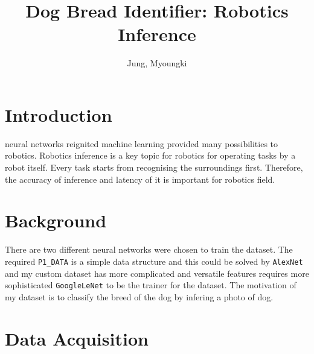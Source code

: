 \documentclass[10pt,journal,compsoc]{IEEEtran}
\begin{document}
\title{Dog Bread Identifier: Robotics Inference}

\author{Jung, Myoungki}

%
{}

\maketitle
\IEEEdisplaynontitleabstractindextext
\IEEEpeerreviewmaketitle
\section{Introduction}
\label{sec:introduction}

 neural networks reignited machine learning provided many possibilities to robotics. Robotics inference is a key topic for robotics for operating tasks by a robot itself. Every task starts from recognising the surroundings first. Therefore, the accuracy of inference and latency of it is important for robotics field.

\section{Background}
There are two different neural networks were chosen to train the dataset.
The required \verb!P1_DATA! is a simple data structure and this could be solved by \verb!AlexNet! and my custom dataset has more complicated and versatile features requires more sophisticated \verb!GoogleLeNet! to be the trainer for the dataset.
The motivation of my dataset is to classify the breed of the dog by infering a photo of dog.

\section{Data Acquisition}
\end{document}
